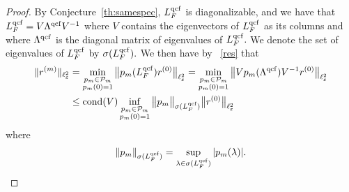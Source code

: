 \documentclass[12pt,reqno]{amsart}
\newcounter{remark}
\begin{document}
\begin{proof}
By Conjecture~\ref{th:samespec}, ${L^{{\rm qcf}}_F}$ is diagonalizable, and we
have that ${L^{{\rm qcf}}_F} = V \Lambda^{{\rm qcf}} V^{-1}$ where $V$ contains the
eigenvectors of ${L^{{\rm qcf}}_F}$ as its columns and where $\Lambda^{{\rm qcf}}$ is the
diagonal matrix of eigenvalues of ${L^{{\rm qcf}}_F}.$ We denote the set of
eigenvalues of ${L^{{\rm qcf}}_F}$ by $\sigma({L^{{\rm qcf}}_F}).$ We then have by
~\eqref{res} that
\begin{equation*}
  \begin{split}
    \|r^{(m)}\|_{\ell^2_{\varepsilon}}
    &= \min_{\substack{p_{m} \in {\mathcal{P}}_{m}\\p_m (0) = 1}}
    \big\|p_m({L^{{\rm qcf}}_F})r^{(0)}\big\|_{\ell^2_{\varepsilon}}
    = \min_{\substack{p_{m} \in {\mathcal{P}}_{m}\\ p_m (0) = 1}}
    \big\|Vp_m(\Lambda^{{\rm qcf}})V^{-1}r^{(0)}\big\|_{\ell^2_{\varepsilon}}\\
    &\le \operatorname{cond}(V) \inf_{\substack{p_{m} \in {\mathcal{P}}_{m}\\ p_m (0) = 1}}
    \big\| p_m \big\|_{\sigma({L^{{\rm qcf}}_F})} \big\|r^{(0)}\big\|_{\ell^2_{\varepsilon}}
\end{split}
\end{equation*}
where
\begin{equation*}
\| p_m \|_{\sigma({L^{{\rm qcf}}_F})} =
    \sup_{\lambda \in \sigma({L^{{\rm qcf}}_F})} | p_m(\lambda) |.
\end{equation*}


\end{proof}
\end{document}
